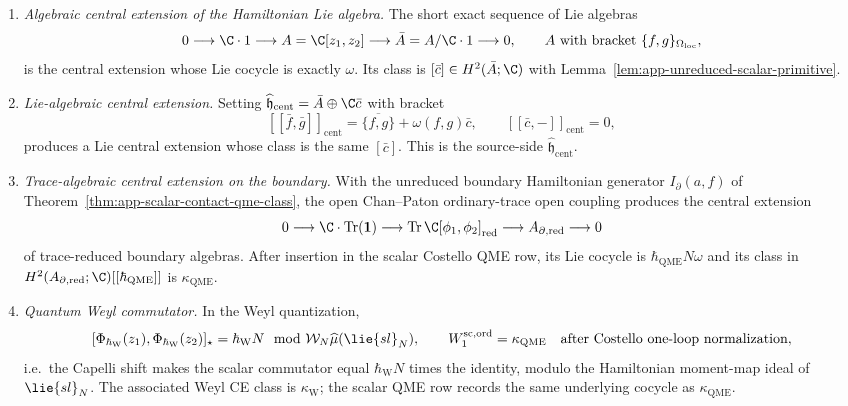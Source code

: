 \begin{thm}
  \begin{enumerate}[label=\textnormal{(\roman*)}]
    \item \emph{Algebraic central extension of the Hamiltonian
      Lie algebra.} The short exact sequence of Lie algebras
      \[
        0\longrightarrow \C\cdot1
        \longrightarrow A=\C[z_1,z_2]
        \longrightarrow \bar A=A/\C\cdot1
        \longrightarrow 0,
        \qquad A\text{ with bracket }
        \{f,g\}_{\Omega_{\mathrm{loc}}},
      \]
      is the central extension whose Lie cocycle is exactly
      \(\omega\).  Its class is \([\bar c]\in H^2(\bar A;\C)\) with
      Lemma~\ref{lem:app-unreduced-scalar-primitive}.
    \item \emph{Lie-algebraic central extension.} Setting
      \(\widehat{\mathfrak h}_{\mathrm{cent}}
        =\bar A\oplus\C\bar c\) with bracket
      \[
        [\![\bar f,\bar g]\!]_{\mathrm{cent}}
        =\overline{\{f,g\}}+\omega(f,g)\bar c,
        \qquad
        [\![\bar c,-]\!]_{\mathrm{cent}}=0,
      \]
      produces a Lie central extension whose class is the same
      \([\bar c]\).  This is the source-side \(\widehat{\mathfrak
      h}_{\mathrm{cent}}\).
    \item \emph{Trace-algebraic central extension on the boundary.}
      With the unreduced boundary Hamiltonian generator
      \(I_\partial(a,f)\) of
      Theorem~\ref{thm:app-scalar-contact-qme-class}, the open Chan--Paton
      ordinary-trace open coupling produces the central extension
      \[
        0\longrightarrow \C\cdot\operatorname{Tr}(\mathbf 1)
        \longrightarrow \operatorname{Tr}\C[\phi_1,\phi_2]_{\mathrm{red}}
        \longrightarrow A_{\partial,\mathrm{red}}
        \longrightarrow 0
      \]
      of trace-reduced boundary algebras.  After insertion in the
      scalar Costello QME row, its Lie cocycle is
      \(\hbar_{\mathrm{QME}}N\omega\) and its class in
      \(H^2(A_{\partial,\mathrm{red}};\C)[[\hbar_{\mathrm{QME}}]]\) is
      \(\kappa_{\mathrm{QME}}\).
    \item \emph{Quantum Weyl commutator.}  In the Weyl quantization,
      \[
        [\Phi_{\hbar_{\mathrm{W}}}(z_1),
          \Phi_{\hbar_{\mathrm{W}}}(z_2)]_{\star}
          =\hbar_{\mathrm{W}}N
        \mod \mathcal W_N\widehat\mu(\lie{sl}_N),
        \qquad
        W_1^{\mathrm{sc,ord}}=\kappa_{\mathrm{QME}}
        \quad\text{after Costello one-loop normalization},
      \]
      i.e.\ the Capelli shift makes the scalar commutator equal
      \(\hbar_{\mathrm{W}}N\) times the identity, modulo the Hamiltonian
      moment-map ideal of \(\lie{sl}_N\).  The associated Weyl CE class
      is \(\kappa_{\mathrm{W}}\); the scalar QME row records the same
      underlying cocycle as \(\kappa_{\mathrm{QME}}\).
  \end{enumerate}


\end{thm}
